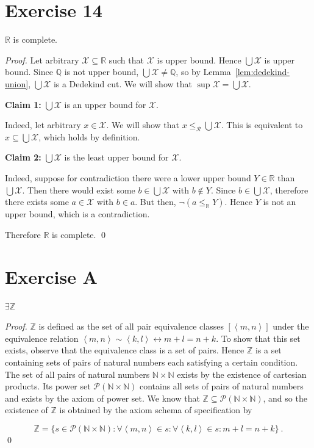\documentclass[11pt]{llncs}
\begin{document}
\section*{Exercise 14}
\begin{lemma}
  $\mathbb{R}$ is complete.
\end{lemma}
\begin{proof}
  Let arbitrary $\mathcal{X} \subseteq \mathbb{R}$ such that $\mathcal{X}$ is
  upper bound. Hence $\bigcup\mathcal{X}$ is upper bound. Since $\mathbb{Q}$ is
  not upper bound, $\bigcup\mathcal{X} \neq \mathbb{Q}$, so by
  Lemma~\ref{lem:dedekind-union}, $\bigcup\mathcal{X}$ is a Dedekind cut.
  We will show that $\sup\mathcal{X} = \bigcup\mathcal{X}$.

  \textbf{Claim 1:} $\bigcup\mathcal{X}$ is an upper bound for $\mathcal{X}$.

  Indeed, let arbitrary $x \in \mathcal{X}$. We will show that
  $x \leq_\mathcal{R} \bigcup\mathcal{X}$. This is equivalent to
  $x \subseteq \bigcup\mathcal{X}$, which holds by definition.

  \textbf{Claim 2:} $\bigcup\mathcal{X}$ is the least upper bound for
  $\mathcal{X}$.

  Indeed, suppose for contradiction there were a lower upper bound
  $Y \in \mathbb{R}$ than $\bigcup\mathcal{X}$. Then there would exist some
  $b \in \bigcup\mathcal{X}$ with $b \not\in Y$. Since $b \in
  \bigcup\mathcal{X}$, therefore there exists some $a \in \mathcal{X}$ with $b
  \in a$. But then, $\lnot(a \leq_\mathbb{R} Y)$. Hence $Y$ is not an upper bound, which is a
  contradiction.

  Therefore $\mathbb{R}$ is complete.
  \qed
\end{proof}

\section*{Exercise A}
\begin{lemma}
  $\exists \mathbb{Z}$
\end{lemma}
\begin{proof}
$\mathbb{Z}$ is defined as the set of all pair equivalence classes $[\left<m,
n\right>]$ under the equivalence relation $\left<m, n\right> \sim \left<k,
l\right> \leftrightarrow m + l = n + k$. To show that this set exists, observe
that the equivalence class is a set of pairs. Hence $\mathbb{Z}$ is a set
containing sets of pairs of natural numbers each satisfying a certain condition.
The set of all pairs of natural numbers $\mathbb{N} \times \mathbb{N}$ exists by
the existence of cartesian products. Its power set $\mathcal{P}(\mathbb{N}
\times \mathbb{N})$ contains all sets of pairs of natural numbers and exists by
the axiom of power set. We know that $\mathbb{Z} \subseteq
\mathcal{P}(\mathbb{N} \times \mathbb{N})$, and so the existence of $\mathbb{Z}$
is obtained by the axiom schema of specification by

\[
\mathbb{Z} = \{s \in \mathcal{P}(\mathbb{N} \times \mathbb{N}):
               \forall \left<m, n\right> \in s: \forall \left<k, l\right> \in s:
               m + l = n + k\}~.
\]
\qed
\end{proof}
\end{document}
